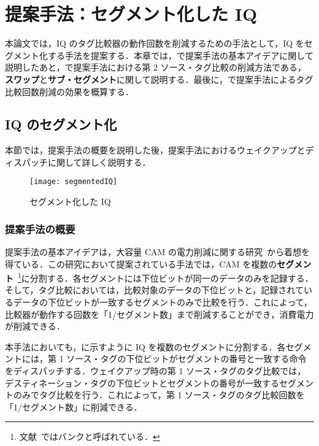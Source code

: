 
\chapter{提案手法：セグメント化した IQ}
\label{sec:segment_IQ}
本論文では，IQ のタグ比較器の動作回数を削減するための手法として，IQ をセグメント化する手法を提案する．本章では，で提案手法の基本アイデアに関して説明したあと，で提案手法における第 2 ソース・タグ比較の削減方法である，\textbf{スワップ}と\textbf{サブ・セグメント}に関して説明する．最後に，で提案手法によるタグ比較回数削減の効果を概算する．

\section{IQ のセグメント化}
\label{sec:segmented_IQ}
本節では，提案手法の概要を説明した後，提案手法におけるウェイクアップとディスパッチに関して詳しく説明する．

\begin{figure}[htb]
  \centering
  \texttt{[image: segmentedIQ]}
  \caption{セグメント化した IQ}
  \label{fig:segmentedIQ}
\end{figure}

\subsection{提案手法の概要}
提案手法の基本アイデアは，大容量 CAM の電力削減に関する研究~\cite{Motomura1990paper, Motomura1990journal}から着想を得ている．この研究において提案されている手法では，CAM を複数の\textbf{セグメント}~\footnote{文献~\cite{Motomura1990paper, Motomura1990journal}ではバンクと呼ばれている．}に分割する．各セグメントには下位ビットが同一のデータのみを記録する．そして，タグ比較においては，比較対象のデータの下位ビットと，記録されているデータの下位ビットが一致するセグメントのみで比較を行う．これによって，比較器が動作する回数を「1/セグメント数」まで削減することができ，消費電力が削減できる．

本手法においても，に示すように IQ を複数のセグメントに分割する．各セグメントには，第 1 ソース・タグの下位ビットがセグメントの番号と一致する命令をディスパッチする．ウェイクアップ時の第 1 ソース・タグのタグ比較では，デスティネーション・タグの下位ビットとセグメントの番号が一致するセグメントのみでタグ比較を行う．これによって，第 1 ソース・タグのタグ比較回数を「1/セグメント数」に削減できる．

